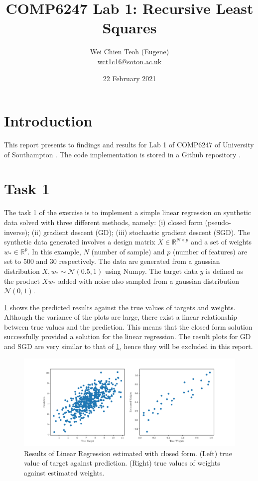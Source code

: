 \documentclass{article}
\title{COMP6247 Lab 1: Recursive Least Squares}
\author{Wei Chien Teoh (Eugene)\\\bigskip \href{mailto:wct1c16@soton.ac.uk}{wct1c16@soton.ac.uk}}
\date{22 February 2021}
\begin{document}
\maketitle

\section{Introduction}

This report presents to findings and results for Lab 1 of COMP6247 of University of Southampton \cite{lab1}. The code implementation is stored in a Github repository \cite{github}.

\section{Task 1}

The task 1 of the exercise is to implement a simple linear regression on synthetic data solved with three different methods, namely: (i) closed form (pseudo-inverse); (ii) gradient descent (GD); (iii) stochastic gradient descent (SGD). The synthetic data generated involves a design matrix $X \in \mathbb{R}^{N \times p}$ and a set of weights $w_* \in \mathbb{R}^p$. In this example, $N$ (number of sample) and $p$ (number of features) are set to 500 and 30 respectively. The data are generated from a gaussian distribution $X, w_* \sim \mathcal{N}(0.5, 1)$ using Numpy. The target data $y$ is defined as the product $Xw_*$ added with noise also sampled from a gaussian distribution $\mathcal{N}(0, 1)$.


\cref{fig:lr_closed} shows the predicted results against the true values of targets and weights. Although the variance of the plots are large, there exist a linear relationship between true values and the prediction. This means that the closed form solution successfully provided a solution for the linear regression. The result plots for GD and SGD are very similar to that of \cref{fig:lr_closed}, hence they will be excluded in this report.

\begin{figure}[h!]
    \centering
    \includegraphics[width=\textwidth]{Figures/closed.pdf}
    \caption{Results of Linear Regression estimated with closed form. (Left) true value of target against prediction. (Right) true values of weights against estimated weights.}
    \label{fig:lr_closed}
\end{figure}
\end{document}
